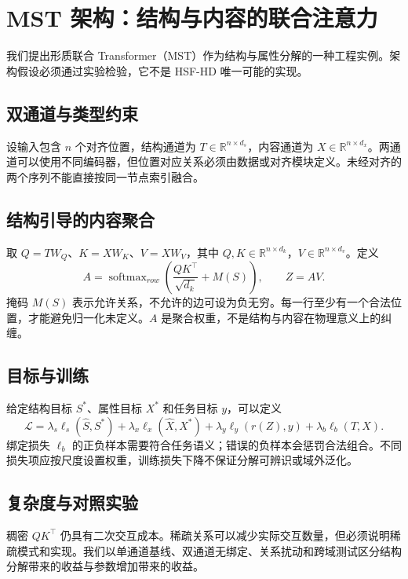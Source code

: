 \chapter{MST 架构：结构与内容的联合注意力}
\label{chp:mst_architecture}
\label{sec:dual_encoder}
\label{sec:fusion_attention}
\label{sec:hybrid_decoder}
\label{sec:mst_complete}
\label{sec:training_paradigm}
我们提出形质联合 Transformer（MST）作为结构与属性分解的一种工程实例。架构假设必须通过实验检验，它不是 HSF-HD 唯一可能的实现。
\section{双通道与类型约束}
设输入包含 $n$ 个对齐位置，结构通道为 $T\in\mathbb R^{n\times d_s}$，内容通道为 $X\in\mathbb R^{n\times d_x}$。两通道可以使用不同编码器，但位置对应关系必须由数据或对齐模块定义。未经对齐的两个序列不能直接按同一节点索引融合。
\section{结构引导的内容聚合}
取 $Q=TW_Q$、$K=XW_K$、$V=XW_V$，其中 $Q,K\in\mathbb R^{n\times d_k}$，$V\in\mathbb R^{n\times d_v}$。定义
\begin{equation}A=\operatorname{softmax}_{row}\left(\frac{QK^\top}{\sqrt{d_k}}+M(S)\right),\qquad Z=AV.\end{equation}
掩码 $M(S)$ 表示允许关系，不允许的边可设为负无穷。每一行至少有一个合法位置，才能避免归一化未定义。$A$ 是聚合权重，不是结构与内容在物理意义上的纠缠。
\section{目标与训练}
给定结构目标 $S^*$、属性目标 $X^*$ 和任务目标 $y$，可以定义
\begin{equation}\mathcal L=\lambda_s\ell_s(\widehat S,S^*)+\lambda_x\ell_x(\widehat X,X^*)+\lambda_y\ell_y(r(Z),y)+\lambda_b\ell_b(T,X).\end{equation}
绑定损失 $\ell_b$ 的正负样本需要符合任务语义；错误的负样本会惩罚合法组合。不同损失项应按尺度设置权重，训练损失下降不保证分解可辨识或域外泛化。
\section{复杂度与对照实验}
稠密 $QK^\top$ 仍具有二次交互成本。稀疏关系可以减少实际交互数量，但必须说明稀疏模式和实现。我们以单通道基线、双通道无绑定、关系扰动和跨域测试区分结构分解带来的收益与参数增加带来的收益。

